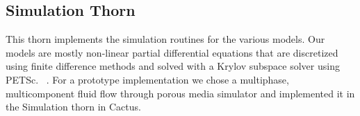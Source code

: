 \documentclass[conference,final]{IEEEtran}
\newcommand{\jhanote}[1]{ {\textcolor{red} { ***Jha: #1 }}}
\newcommand{\jhanote}[1]{}
\begin{document}

\subsection{Simulation Thorn}

This thorn implements the simulation routines for the various models.
Our models are mostly non-linear partial differential equations that
are discretized using finite difference methods and solved with a
Krylov subspace solver using PETSc. ~\cite{PETSc}. For a prototype
implementation we chose a multiphase, multicomponent fluid flow
through porous media simulator and implemented it in the Simulation
thorn in Cactus.


\end{document}
